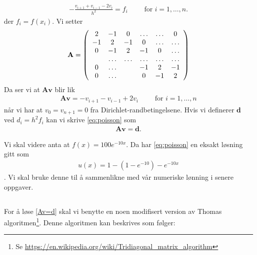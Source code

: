 \documentclass[11pt]{article}
\renewcommand{\vec}{\mathbf} %
\begin{document}
\begin{align}
  - \frac{ v_{i+1} + v_{i-1} - 2v_i }{ h^2 } =
  f_i\hspace{1cm}\text{for } i = 1,\dots,n.
\end{align}
der $f_i = f(x_i)$. Vi setter 
\begin{align*}
      {\bf A} = \left(\begin{array}{cccccc}
                           2& -1& 0 &\dots   & \dots &0 \\
                           -1 & 2 & -1 &0 &\dots &\dots \\
                           0&-1 &2 & -1 & 0 & \dots \\
                           & \dots   & \dots &\dots   &\dots & \dots \\
                           0&\dots   &  &-1 &2& -1 \\
                           0&\dots    &  & 0  &-1 & 2 \\
                      \end{array} \right)
\end{align*}
Da ser vi at $\vec A \vec v$ blir lik 
\begin{align*}
  \vec A \vec v = -v_{i+1} - v_{i-1} + 2v_i\hspace{1cm}\text{for } i = 1,\dots,n
\end{align*}
når vi har at $v_0 = v_{n+1} = 0$ fra Dirichlet-randbetingelsene. Hvis
vi definerer $\vec d$ ved $d_i = h^2f_i$ kan vi skrive
\eqref{eq:poisson} som 
\begin{align}
  \vec A \vec v = \vec d.\label{Av=d}
\end{align}
 

Vi skal videre anta at $f(x) = 100 e^{-10x}$. Da har
\eqref{eq:poisson} en eksakt løsning gitt som
 \begin{align}
u(x) = 1 -\left(1-e^{-10}\right) - e^{-10x}\label{eq:exact}
\end{align}. 
Vi skal bruke denne til å
sammenlikne med vår numeriske lønning i senere oppgaver.

\subsection{}
For å løse \eqref{Av=d} skal vi benytte en noen modifisert version av
Thomas algoritmen\footnote{Se
  \url{https://en.wikipedia.org/wiki/Tridiagonal_matrix_algorithm}}. Denne
algoritmen kan beskrives som følger: 
\end{document}
